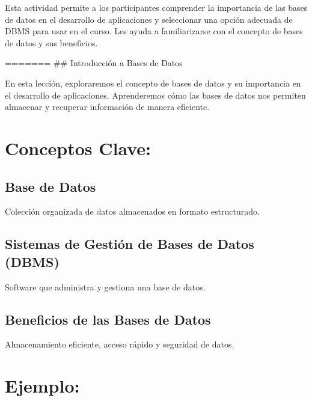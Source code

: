 \documentclass[
  a4paper,
  DIV=11,
  numbers=noendperiod,
  onepage,
  openany]{scrreprt}
\begin{document}
Esta actividad permite a los participantes comprender la importancia de
las bases de datos en el desarrollo de aplicaciones y seleccionar una
opción adecuada de DBMS para usar en el curso. Les ayuda a
familiarizarse con el concepto de bases de datos y sus beneficios.

======= \#\# Introducción a Bases de Datos

En esta lección, exploraremos el concepto de bases de datos y su
importancia en el desarrollo de aplicaciones. Aprenderemos cómo las
bases de datos nos permiten almacenar y recuperar información de manera
eficiente.

\hypertarget{conceptos-clave-61}{%
\section{Conceptos Clave:}\label{conceptos-clave-61}}

\hypertarget{base-de-datos-1}{%
\subsection{Base de Datos}\label{base-de-datos-1}}

Colección organizada de datos almacenados en formato estructurado.

\hypertarget{sistemas-de-gestiuxf3n-de-bases-de-datos-dbms-1}{%
\subsection{Sistemas de Gestión de Bases de Datos
(DBMS)}\label{sistemas-de-gestiuxf3n-de-bases-de-datos-dbms-1}}

Software que administra y gestiona una base de datos.

\hypertarget{beneficios-de-las-bases-de-datos-1}{%
\subsection{Beneficios de las Bases de
Datos}\label{beneficios-de-las-bases-de-datos-1}}

Almacenamiento eficiente, acceso rápido y seguridad de datos.

\hypertarget{ejemplo-63}{%
\section{Ejemplo:}\label{ejemplo-63}}
\end{document}
